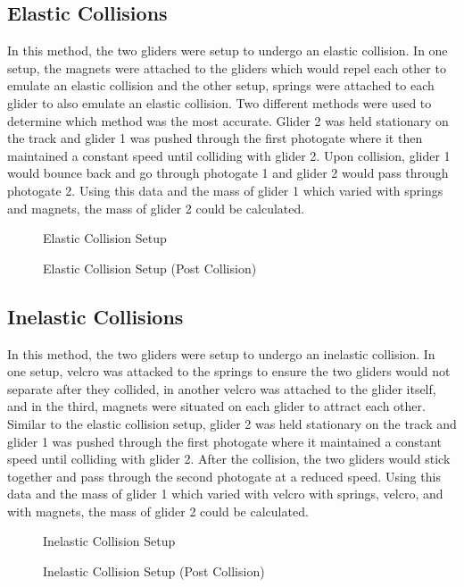 \documentclass[12pt]{article}
\begin{document}
\subsection{Elastic Collisions}
In this method, the two gliders were setup to undergo an elastic collision. In one setup, the magnets were attached to the gliders which would repel each other to emulate an elastic collision and the other setup, springs were attached to each glider to also emulate an elastic collision. Two different methods were used to determine which method was the most accurate. Glider 2 was held stationary on the track and glider 1 was pushed through the first photogate where it then maintained a constant speed until colliding with glider 2. Upon collision, glider 1 would bounce back and go through photogate 1 and glider 2 would pass through photogate 2. Using this data and the mass of glider 1 which varied with springs and magnets, the mass of glider 2 could be calculated.
\begin{subfigures}
\begin{figure}[H]
    \centering
    
    \caption{Elastic Collision Setup}
\end{figure}
\begin{figure}[H]
    \centering
    
    \caption{Elastic Collision Setup (Post Collision)}
\end{figure}
\end{subfigures}
\subsection{Inelastic Collisions}
In this method, the two gliders were setup to undergo an inelastic collision. In one setup, velcro was attacked to the springs to ensure the two gliders would not separate after they collided, in another velcro was attached to the glider itself, and in the third, magnets were situated on each glider to attract each other. Similar to the elastic collision setup, glider 2 was held stationary on the track and glider 1 was pushed through the first photogate where it maintained a constant speed until colliding with glider 2. After the collision, the two gliders would stick together and pass through the second photogate at a reduced speed. Using this data and the mass of glider 1 which varied with velcro with springs, velcro, and with magnets, the mass of glider 2 could be calculated.
\begin{subfigures}
\begin{figure}[H]
    \centering
    \caption{Inelastic Collision Setup}
\end{figure}
\begin{figure}[H]
    \centering
    
    \caption{Inelastic Collision Setup (Post Collision)}
\end{figure}
\end{subfigures}
\end{document}
